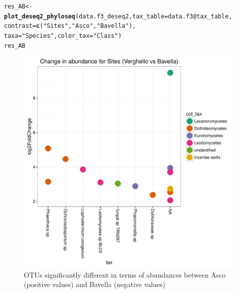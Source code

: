 \documentclass[12pt]{article}\usepackage[]{graphicx}\usepackage[]{color}
\makeatletter
\def\maxwidth{ %
  \ifdim\Gin@nat@width>\linewidth
    \linewidth
  \else
    \Gin@nat@width
  \fi
}
\newcommand{\hlstr}[1]{\textcolor[rgb]{0.192,0.494,0.8}{#1}}%
\newcommand{\hlopt}[1]{\textcolor[rgb]{0,0,0}{#1}}%
\newcommand{\hlstd}[1]{\textcolor[rgb]{0.345,0.345,0.345}{#1}}%
\newcommand{\hlkwb}[1]{\textcolor[rgb]{0.69,0.353,0.396}{#1}}%
\newcommand{\hlkwc}[1]{\textcolor[rgb]{0.333,0.667,0.333}{#1}}%
\newcommand{\hlkwd}[1]{\textcolor[rgb]{0.737,0.353,0.396}{\textbf{#1}}}%
\newenvironment{kframe}{%
 \def\at@end@of@kframe{}%
 \ifinner\ifhmode%
  \def\at@end@of@kframe{\end{minipage}}%
  \begin{minipage}{\columnwidth}%
 \fi\fi%
 \def\FrameCommand##1{\hskip\@totalleftmargin \hskip-\fboxsep
 \colorbox{shadecolor}{##1}\hskip-\fboxsep
     \hskip-\linewidth \hskip-\@totalleftmargin \hskip\columnwidth}%
 \MakeFramed {\advance\hsize-\width
   \@totalleftmargin\z@ \linewidth\hsize
   \@setminipage}}%
 {\par\unskip\endMakeFramed%
 \at@end@of@kframe}
\newenvironment{knitrout}{}{} %
\numberwithin{figure}{section}
\makeatother
\begin{document}
\begin{landscape}
\begin{knitrout}\small
{}\color{fgcolor}\begin{kframe}
\begin{alltt}
\hlstd{res_AB} \hlkwb{<-} \hlkwd{plot_deseq2_phyloseq}\hlstd{(data.f3_deseq2,} \hlkwc{tax_table} \hlstd{= data.f3}\hlopt{@}\hlkwc{tax_table}\hlstd{,}
                               \hlkwc{contrast} \hlstd{=} \hlkwd{c}\hlstd{(}\hlstr{"Sites"}\hlstd{,} \hlstr{"Asco"}\hlstd{,} \hlstr{"Bavella"}\hlstd{),}
                               \hlkwc{taxa} \hlstd{=} \hlstr{"Species"}\hlstd{,} \hlkwc{color_tax} \hlstd{=} \hlstr{"Class"}\hlstd{)}
\hlstd{res_AB}
\end{alltt}
\end{kframe}\begin{figure}

{\centering \includegraphics[width=\maxwidth]{figure/unnamed-chunk-74-1} 

}

\caption[OTUs significantly different in terms of abundances between Asco (positive values) and Bavella (negative values)]{OTUs significantly different in terms of abundances between Asco (positive values) and Bavella (negative values)}\label{fig:unnamed-chunk-74}
\end{figure}


\end{knitrout}
\end{landscape}
\end{document}
